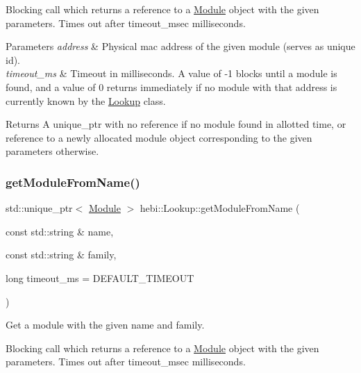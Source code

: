 Blocking call which returns a reference to a \hyperlink{classhebi_1_1Module}{Module} object with the given parameters. Times out after timeout\+\_\+msec milliseconds. 
\begin{DoxyParams}{Parameters}
{\em address} & Physical mac address of the given module (serves as unique id). \\
\hline
{\em timeout\+\_\+ms} & Timeout in milliseconds. A value of -\/1 blocks until a module is found, and a value of 0 returns immediately if no module with that address is currently known by the \hyperlink{classhebi_1_1Lookup}{Lookup} class. \\
\hline
\end{DoxyParams}
\begin{DoxyReturn}{Returns}
A unique\+\_\+ptr with no reference if no module found in allotted time, or reference to a newly allocated module object corresponding to the given parameters otherwise. 
\end{DoxyReturn}
\mbox{\label{classhebi_1_1Lookup_aaee883fe7e060f0ea0638a09bc49f54b}} 
\subsubsection{\texorpdfstring{get\+Module\+From\+Name()}{getModuleFromName()}}
{\footnotesize\ttfamily std\+::unique\+\_\+ptr$<$ \hyperlink{classhebi_1_1Module}{Module} $>$ hebi\+::\+Lookup\+::get\+Module\+From\+Name (\begin{DoxyParamCaption}\item[{const std\+::string \&}]{name,  }\item[{const std\+::string \&}]{family,  }\item[{long}]{timeout\+\_\+ms = {\ttfamily DEFAULT\+\_\+TIMEOUT} }\end{DoxyParamCaption})}



Get a module with the given name and family. 

Blocking call which returns a reference to a \hyperlink{classhebi_1_1Module}{Module} object with the given parameters. Times out after timeout\+\_\+msec milliseconds.


